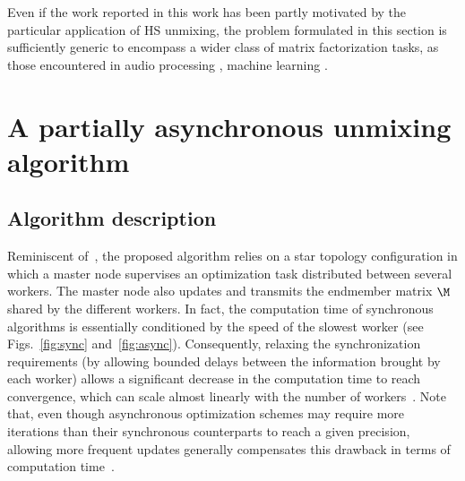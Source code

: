 \documentclass[journal,final,letterpaper,twoside,twocolumn]{IEEEtran}
\begin{document}
\begin{remark}
Even if the work reported in this work has been partly motivated by the particular application of HS unmixing, the problem formulated in this section is sufficiently generic to encompass a wider class of matrix factorization tasks, as those encountered in audio processing \cite{Fevotte2007}, machine learning \cite{Tan2013,Gao2014}.
\end{remark}


\section{A partially asynchronous unmixing algorithm} \label{sec:algorithm}

    \subsection{Algorithm description}
    
    

Reminiscent of~\cite{Chang2016}, the proposed algorithm relies on a star topology configuration in which a master node supervises an optimization task distributed between several workers. The master node also updates and transmits the endmember matrix $\M$ shared by the different workers. In fact, the computation time of synchronous algorithms is essentially conditioned by the speed of the slowest worker (see Figs.~\ref{fig:sync} and~\ref{fig:async}). Consequently, relaxing the synchronization requirements (by allowing bounded delays between the information brought by each worker) allows a significant decrease in the computation time to reach convergence, which can scale almost linearly with the number of workers~\cite{Chang2016,Davis2016}. Note that, even though asynchronous optimization schemes may require more iterations than their synchronous counterparts to reach a given precision, allowing more frequent updates generally compensates this drawback in terms of computation time~\cite{Chang2016}.
\end{document}
